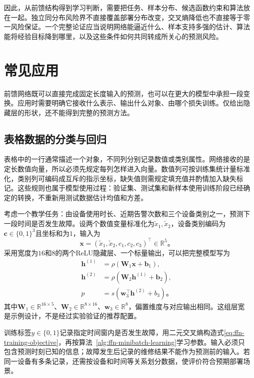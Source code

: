 因此，从前馈结构得到学习判断，需要把任务、样本分布、候选函数约束和算法放在一起。独立同分布风险界不直接覆盖部署分布改变，交叉熵降低也不直接等于零一风险保证。一个完整论证应当说明网络能逼近什么、样本支持多强的估计、算法能将经验目标降到哪里，以及这些条件如何共同转成所关心的预测风险。

\section{常见应用}
\label{sec:ffn-applications}

前馈网络既可以直接完成固定长度输入的预测，也可以在更大的模型中承担一段变换。应用时需要明确它接收什么表示、输出什么对象、由哪个损失训练。仅给出隐藏层的形状，还不能得到完整的预测方法。

\subsection{表格数据的分类与回归}
\label{sec:ffn-tabular}

表格中的一行通常描述一个对象，不同列分别记录数值或类别属性。网络接收的是定长数值向量，所以必须先规定每列怎样进入向量。数值列可按训练集统计量标准化，类别列可编码成互斥的指示坐标，缺失值则需规定填充值并酌情加入缺失标记。这些规则也属于模型使用过程：验证集、测试集和新样本使用训练阶段已经确定的转换，不重新用测试数据估计均值和方差。

考虑一个教学任务：由设备使用时长、近期告警次数和三个设备类别之一，预测下一段时间是否发生故障。设两个数值变量标准化为$\widetilde x_1,\widetilde x_2$，设备类别编码为$\bm{c}\in\{0,1\}^{3}$且坐标和为$1$，输入为
\[
  \bm{x}=(\widetilde x_1,\widetilde x_2,c_1,c_2,c_3)^{\top}
  \in\mathbb{R}^{5}\text{。}
\]
采用宽度为$16$和$8$的两个ReLU隐藏层、一个标量输出，可以把完整模型写为
\begin{equation}
  \begin{aligned}
    \bm{h}^{(1)}&=\rho(\bm{W}_1\bm{x}+\bm{b}_1),\\
    \bm{h}^{(2)}&=\rho(\bm{W}_2\bm{h}^{(1)}+\bm{b}_2),\\
    p&=s(\bm{w}_3^{\top}\bm{h}^{(2)}+b_3)\text{。}
  \end{aligned}
  \label{eq:ffn-tabular-classifier}
\end{equation}
其中$\bm{W}_1\in\mathbb{R}^{16\times5}$、$\bm{W}_2\in\mathbb{R}^{8\times16}$、$\bm{w}_3\in\mathbb{R}^{8}$，偏置维度与对应输出相同。这组层宽是示例设计，不是经过实验验证的推荐配置。

训练标签$y\in\{0,1\}$记录指定时间窗内是否发生故障，用二元交叉熵构造式\eqref{eq:ffn-training-objective}，再按算法~\ref{alg:ffn-minibatch-learning}学习参数。输入必须只包含预测时刻已知的信息；故障发生后记录的维修结果不能作为预测前的输入。若同一设备有多条记录，还需按设备和时间等关系划分数据，使评价符合预期部署场景。

